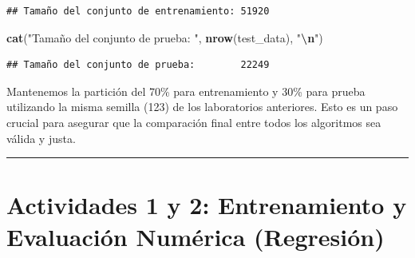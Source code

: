 \documentclass[
]{article}
\newenvironment{Shaded}{\begin{snugshade}}{\end{snugshade}}
\newcommand{\FunctionTok}[1]{\textcolor[rgb]{0.13,0.29,0.53}{\textbf{#1}}}
\newcommand{\NormalTok}[1]{#1}
\newcommand{\SpecialCharTok}[1]{\textcolor[rgb]{0.81,0.36,0.00}{\textbf{#1}}}
\newcommand{\StringTok}[1]{\textcolor[rgb]{0.31,0.60,0.02}{#1}}
\begin{document}
\begin{verbatim}
## Tamaño del conjunto de entrenamiento: 51920
\end{verbatim}

\begin{Shaded}
\begin{Highlighting}[]
\FunctionTok{cat}\NormalTok{(}\StringTok{"Tamaño del conjunto de prueba:       "}\NormalTok{, }\FunctionTok{nrow}\NormalTok{(test\_data), }\StringTok{"}\SpecialCharTok{\textbackslash{}n}\StringTok{"}\NormalTok{)}
\end{Highlighting}
\end{Shaded}

\begin{verbatim}
## Tamaño del conjunto de prueba:        22249
\end{verbatim}

Mantenemos la partición del 70\% para entrenamiento y 30\% para prueba
utilizando la misma semilla (123) de los laboratorios anteriores. Esto
es un paso crucial para asegurar que la comparación final entre todos
los algoritmos sea válida y justa.

\begin{center}\rule{0.5\linewidth}{0.5pt}\end{center}

\section{Actividades 1 y 2: Entrenamiento y Evaluación Numérica
(Regresión)}\label{actividades-1-y-2-entrenamiento-y-evaluaciuxf3n-numuxe9rica-regresiuxf3n}
\end{document}
